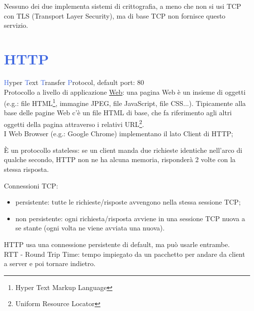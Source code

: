 \noindent Nessuno dei due implementa sistemi di crittografia, a meno che non si usi TCP con TLS (Transport Layer Security), ma di base TCP non fornisce questo servizio.\\

\section*{\textcolor{RoyalBlue}{HTTP}} 
\noindent \textcolor{RoyalBlue}{H}yper \textcolor{RoyalBlue}{T}ext \textcolor{RoyalBlue}{T}ransfer \textcolor{RoyalBlue}{P}rotocol, default port: 80\\

\noindent Protocollo a livello di applicazione \underline{Web}: una pagina Web è un insieme di oggetti (e.g.: file HTML\footnote{Hyper Text Markup Language}, immagine JPEG, file JavaScript, file CSS...). Tipicamente alla base delle pagine Web c'è un file HTML di base, che fa riferimento agli altri oggetti della pagina attraverso i relativi URL\footnote{Uniform Resource Locator}.\\

\noindent I Web Browser (e.g.: Google Chrome) implementano il lato Client di HTTP;

\noindent È un protocollo stateless: se un client manda due richieste identiche nell'arco di qualche secondo, HTTP non ne ha alcuna memoria, risponderà 2 volte con la stessa risposta.

\noindent Connessioni TCP:
\begin{itemize}
    \item persistente: tutte le richieste/risposte avvengono nella stessa sessione TCP;
    \item non persistente: ogni richiesta/risposta avviene in una sessione TCP nuova a se stante (ogni volta ne viene avviata una nuova).
\end{itemize}
\noindent HTTP usa una connessione persistente di default, ma può usarle entrambe. \\

\noindent {}RTT - Round Trip Time: tempo impiegato da un pacchetto per andare da client a server e poi tornare indietro.

